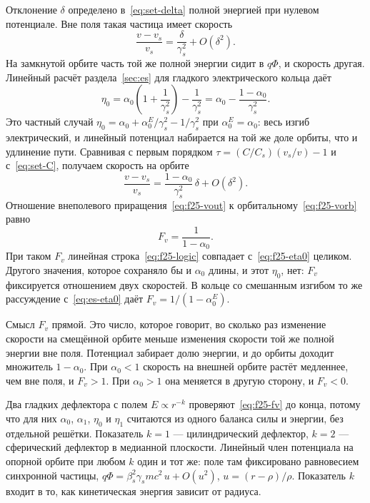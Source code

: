 Отклонение $\delta$ определено в~\eqref{eq:set-delta} полной энергией при нулевом потенциале. Вне поля такая частица имеет скорость
\begin{equation}
\label{eq:f25-vout}
\frac{v-v_s}{v_s}
=
\frac{\delta}{\gamma_s^2}+O(\delta^2).
\end{equation}
На замкнутой орбите часть той же полной энергии сидит в $q\Phi$, и скорость другая. Линейный расчёт раздела~\ref{sec:es} для гладкого электрического кольца даёт
\begin{equation}
\label{eq:f25-eta0}
\eta_0
=
\alpha_0\left(1+\frac{1}{\gamma_s^2}\right)-\frac{1}{\gamma_s^2}
=
\alpha_0-\frac{1-\alpha_0}{\gamma_s^2}.
\end{equation}
Это частный случай $\eta_0=\alpha_0+\alpha_0^{E}/\gamma_s^2-1/\gamma_s^2$ при $\alpha_0^{E}=\alpha_0$: весь изгиб электрический, и линейный потенциал набирается на той же доле орбиты, что и удлинение пути. Сравнивая с первым порядком $\tau=(C/C_s)(v_s/v)-1$ и с~\eqref{eq:set-C}, получаем скорость на орбите
\begin{equation}
\label{eq:f25-vorb}
\frac{v-v_s}{v_s}
=
\frac{1-\alpha_0}{\gamma_s^2}\,\delta+O(\delta^2).
\end{equation}
Отношение внеполевого приращения~\eqref{eq:f25-vout} к орбитальному~\eqref{eq:f25-vorb} равно
\begin{equation}
\label{eq:f25-fv}
F_v
=
\frac{1}{1-\alpha_0}.
\end{equation}
При таком $F_v$ линейная строка~\eqref{eq:f25-logic} совпадает с~\eqref{eq:f25-eta0} целиком. Другого значения, которое сохраняло бы и $\alpha_0$ длины, и этот $\eta_0$, нет: $F_v$ фиксируется отношением двух скоростей. В кольце со смешанным изгибом то же рассуждение с~\eqref{eq:es-eta0} даёт $F_v=1/(1-\alpha_0^E)$.

Смысл $F_v$ прямой. Это число, которое говорит, во сколько раз изменение скорости на смещённой орбите меньше изменения скорости той же полной энергии вне поля. Потенциал забирает долю энергии, и до орбиты доходит множитель $1-\alpha_0$. При $\alpha_0<1$ скорость на внешней орбите растёт медленнее, чем вне поля, и $F_v>1$. При $\alpha_0>1$ она меняется в другую сторону, и $F_v<0$.

Два гладких дефлектора с полем $E\propto r^{-k}$ проверяют~\eqref{eq:f25-fv} до конца, потому что для них $\alpha_0$, $\alpha_1$, $\eta_0$ и $\eta_1$ считаются из одного баланса силы и энергии, без отдельной решётки. Показатель $k=1$ --- цилиндрический дефлектор, $k=2$ --- сферический дефлектор в медианной плоскости. Линейный член потенциала на опорной орбите при любом $k$ один и тот же: поле там фиксировано равновесием синхронной частицы, $q\Phi=\beta_s^2\gamma_s mc^2\,u+O(u^2)$, $u=(r-\rho)/\rho$. Показатель $k$ входит в то, как кинетическая энергия зависит от радиуса.

